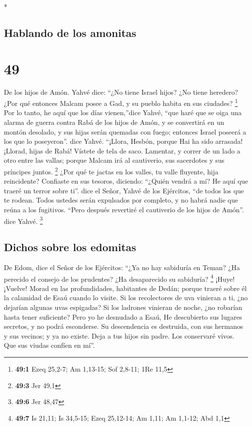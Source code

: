 \begin{paracol}{2}
\begin{otherlanguage}{english}
\end{otherlanguage}

\switchcolumn[0]*

\hypertarget{hablando-de-los-amonitas}{%
\subsection{Hablando de los amonitas}\label{hablando-de-los-amonitas}}

\hypertarget{section-96}{%
\section{49}\label{section-96}}

 De los hijos de Amón. Yahvé dice: ``¿No tiene Israel
hijos? ¿No tiene heredero? ¿Por qué entonces Malcam posee a Gad, y su
pueblo habita en sus ciudades? \footnote{\textbf{49:1} Ezeq 25,2-7; Am
  1,13-15; Sof 2,8-11; 1Re 11,5}  Por lo tanto, he aquí
que los días vienen,''dice Yahvé, ``que haré que se oiga una alarma de
guerra contra Rabá de los hijos de Amón, y se convertirá en un montón
desolado, y sus hijas serán quemadas con fuego; entonces Israel poseerá
a los que lo poseyeron''. dice Yahvé.  ``¡Llora, Hesbón,
porque Hai ha sido arrasada! ¡Llorad, hijas de Rabá! Vístete de tela de
saco. Lamentar, y correr de un lado a otro entre las vallas; porque
Malcam irá al cautiverio, sus sacerdotes y sus príncipes juntos.
\footnote{\textbf{49:3} Jer 49,1}  ¿Por qué te jactas en
los valles, tu valle fluyente, hija reincidente? Confiaste en sus
tesoros, diciendo: ``¿Quién vendrá a mí?  He aquí que
traeré un terror sobre ti''. dice el Señor, Yahvé de los Ejércitos, ``de
todos los que te rodean. Todos ustedes serán expulsados por completo, y
no habrá nadie que reúna a los fugitivos.  ``Pero después
revertiré el cautiverio de los hijos de Amón''. dice Yahvé. \footnote{\textbf{49:6}
  Jer 48,47}

\hypertarget{dichos-sobre-los-edomitas}{%
\subsection{Dichos sobre los edomitas}\label{dichos-sobre-los-edomitas}}

 De Edom, dice el Señor de los Ejércitos: ``¿Ya no hay
sabiduría en Teman? ¿Ha perecido el consejo de los prudentes? ¿Ha
desaparecido su sabiduría? \footnote{\textbf{49:7} Is 21,11; Is 34,5-15;
  Ezeq 25,12-14; Am 1,11; Am 1,1-12; Abd 1,1}  ¡Huye!
¡Vuelve! Morad en las profundidades, habitantes de Dedán; porque traeré
sobre él la calamidad de Esaú cuando lo visite.  Si los
recolectores de uva vinieran a ti, ¿no dejarían algunas uvas espigadas?
Si los ladrones vinieran de noche, ¿no robarían hasta tener suficiente?
 Pero yo he desnudado a Esaú, He descubierto sus lugares
secretos, y no podrá esconderse. Su descendencia es destruida, con sus
hermanos y sus vecinos; y ya no existe.  Deja a tus hijos
sin padre. Los conservaré vivos. Que sus viudas confíen en mí''.


\end{paracol}
